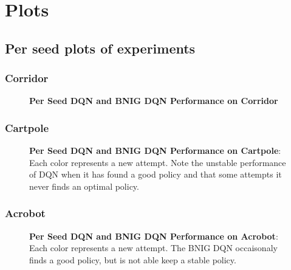 \chapter{Plots}\label{Appendix}

\section{Per seed plots of experiments}

\subsection{Corridor}

\begin{figure}[H]
    \centering
    \caption{\textbf{Per Seed DQN and BNIG DQN Performance on Corridor}}
    \label{fig:nn_per_cartpole}
\end{figure}

\subsection{Cartpole}

\begin{figure}[H]
    \centering
    \caption{\textbf{Per Seed DQN and BNIG DQN Performance on Cartpole}: Each color represents a new attempt. Note the unstable performance of DQN when it has found a good policy and that some attempts it never finds an optimal policy.}
    \label{fig:nn_per_cartpole}
\end{figure}

\subsection{Acrobot}

\begin{figure}[H]
    \centering
    \caption{\textbf{Per Seed DQN and BNIG DQN Performance on Acrobot}: Each color represents a new attempt. The BNIG DQN occaisonaly finds a good policy, but is not able keep a stable policy.}
    \label{fig:nn_per_acrobot}
\end{figure}
